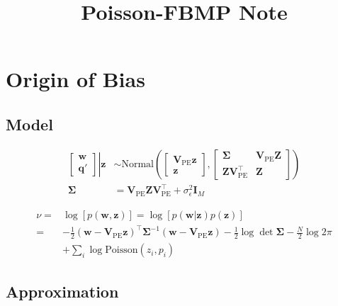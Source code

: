 \documentclass[notitlepage]{article}
\title{Poisson-FBMP Note}
\date{}
\begin{document}
\newcommand{\ud}{\mathrm{d}}

\maketitle
\tableofcontents

\section{Origin of Bias}

\subsection{Model}

\begin{equation}
\begin{aligned}
    \left.
    \begin{bmatrix}
        \bm{w} \\
        \bm{q}'
    \end{bmatrix}
    \right\vert\bm{z}
    &\sim \mathrm{Normal}\left(
    \begin{bmatrix}
        \bm{V}_\mathrm{PE}\bm{z} \\
        \bm{z}
    \end{bmatrix}, 
    \begin{bmatrix}
        \bm{\Sigma} & \bm{V}_\mathrm{PE}\bm{Z} \\
        \bm{Z}\bm{V}_\mathrm{PE}^\intercal & \bm{Z}
    \end{bmatrix}
    \right) \\
    \bm{\Sigma} &= \bm{V}_\mathrm{PE}\bm{Z}\bm{V}_\mathrm{PE}^\intercal+\sigma_\epsilon^2\bm{I}_M 
\end{aligned}
\end{equation}

\begin{equation}
\begin{aligned}
    \nu =& \log[p(\bm{w},\bm{z})] = \log[p(\bm{w}|\bm{z})p(\bm{z})] \\
    =& -\frac{1}{2}(\bm{w}-\bm{V}_\mathrm{PE}\bm{z})^\intercal\bm{\Sigma}^{-1}(\bm{w}-\bm{V}_\mathrm{PE}\bm{z})-\frac{1}{2}\log\det\bm{\Sigma}-\frac{N}{2}\log2\pi \\
    &+ \sum_{i}\log{\mathrm{Poisson}(z_i,p_i)}
\end{aligned}
\end{equation}

\subsection{Approximation}
\end{document}
